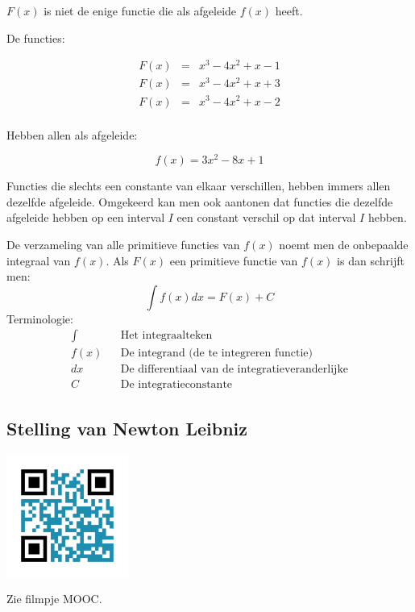 $F(x)$ is niet de enige functie die als afgeleide $f(x)$ heeft.

De functies:

\begin{eqnarray*}
F(x) &=& x^3-4x^2+x-1 \\
F(x) &=& x^3-4x^2+x+3 \\
F(x) &=& x^3-4x^2+x-2 \\
\end{eqnarray*}

Hebben allen als afgeleide:

\begin{equation*}
f(x) = 3x^2-8x+1
\end{equation*}

Functies die slechts een constante van elkaar verschillen, hebben immers allen dezelfde afgeleide. Omgekeerd kan men ook aantonen dat functies die dezelfde afgeleide hebben op een interval $I$ een constant verschil op dat interval $I$ hebben.

\begin{definitie}
De verzameling van alle primitieve functies van $f(x)$ noemt men de onbepaalde integraal van $f(x)$. 
Als $F(x)$ een primitieve functie van $f(x)$ is dan schrijft men:
\begin{equation*}
\int f(x)dx = F(x) + C
\end{equation*}
Terminologie:
\begin{eqnarray*}
\int && \text{Het integraalteken} \\
f(x) && \text{De integrand (de te integreren functie)} \\
dx && \text{De differentiaal van de integratieveranderlijke} \\
C && \text{De integratieconstante }
\end{eqnarray*}
\end{definitie}

\subsection{Stelling van Newton Leibniz}
\begin{minipage}{.25\linewidth}
	\raggedright
	\includegraphics[width=4cm]{6_afgeleiden_integralen/inputs/QR_Code_STNEWTONLEIBNIZ_module6_2}
\end{minipage}
\begin{minipage}{.7\linewidth}
	Zie filmpje MOOC.
\end{minipage}

